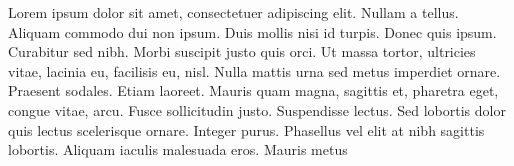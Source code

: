 \begin{zusammenfassung}
Lorem ipsum dolor sit amet, consectetuer adipiscing elit. Nullam a tellus.
Aliquam commodo dui non ipsum. Duis mollis nisi id turpis. Donec quis ipsum.
Curabitur sed nibh. Morbi suscipit justo quis orci. Ut massa tortor, ultricies
vitae, lacinia eu, facilisis eu, nisl. Nulla mattis urna sed metus imperdiet
ornare. Praesent sodales. Etiam laoreet. Mauris quam magna, sagittis et,
pharetra eget, congue vitae, arcu. Fusce sollicitudin justo. Suspendisse
lectus. Sed lobortis dolor quis lectus scelerisque ornare. Integer purus.
Phasellus vel elit at nibh sagittis lobortis. Aliquam iaculis malesuada eros.
Mauris metus
\end{zusammenfassung}
